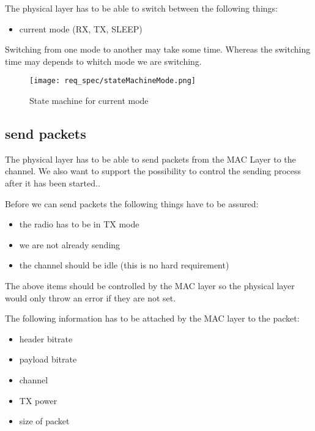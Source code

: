 The physical layer has to be able to switch between the following things:

\begin{itemize}
 \item current mode (RX, TX, SLEEP)
\end{itemize}

Switching from one mode to another may take some time. Whereas the switching time may depends to whitch mode we are switching.

\begin{figure}[t]
 \centering
 \texttt{[image: req\_spec/stateMachineMode.png]}
 \caption{State machine for current mode}
 \label{fig: mode state machine}
\end{figure}

\pagebreak
\subsection{send packets}

The physical layer has to be able to send packets from the MAC 
Layer to the channel. 
We also want to support the possibility to control
the sending process after it has been started..

Before we can send packets the following things have to be 
assured:
\linebreak
\begin{itemize}
 \item the radio has to be in TX mode
 \item we are not already sending
 \item the channel should be idle (this is no hard requirement)
\end{itemize}

The above items should be controlled by the MAC layer so the physical layer 
would only throw an error if they are not set.

The following information has to be attached by the MAC layer to the packet:

\begin{itemize}
 \item header bitrate
 \item payload bitrate
 \item channel
 \item TX power
 \item size of packet
\end{itemize}


